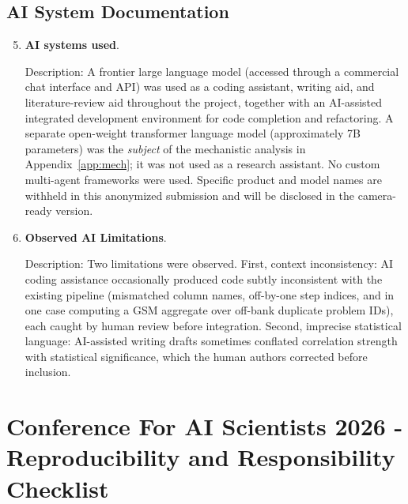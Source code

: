 \subsection*{AI System Documentation}

\begin{enumerate}
  \setcounter{enumi}{4}

  \item \textbf{AI systems used}.

  Description: A frontier large language model (accessed through a commercial
  chat interface and API) was used as a coding assistant, writing aid, and
  literature-review aid throughout the project, together with an AI-assisted
  integrated development environment for code completion and refactoring. A
  separate open-weight transformer language model (approximately 7B parameters)
  was the \emph{subject} of the mechanistic analysis in
  Appendix~\ref{app:mech}; it was not used as a research assistant. No custom
  multi-agent frameworks were used. Specific product and model names are
  withheld in this anonymized submission and will be disclosed in the
  camera-ready version.

  \item \textbf{Observed AI Limitations}.

  Description: Two limitations were observed. First, context inconsistency: AI
  coding assistance occasionally produced code subtly inconsistent with the
  existing pipeline (mismatched column names, off-by-one step indices, and in
  one case computing a GSM aggregate over off-bank duplicate problem IDs), each
  caught by human review before integration. Second, imprecise statistical
  language: AI-assisted writing drafts sometimes conflated correlation strength
  with statistical significance, which the human authors corrected before
  inclusion.

\end{enumerate}

\newpage

\section*{Conference For AI Scientists 2026 - Reproducibility and Responsibility Checklist}
\label{checklist_reproducibility}

